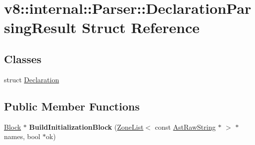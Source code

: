 \hypertarget{structv8_1_1internal_1_1_parser_1_1_declaration_parsing_result}{}\section{v8\+:\+:internal\+:\+:Parser\+:\+:Declaration\+Parsing\+Result Struct Reference}
\label{structv8_1_1internal_1_1_parser_1_1_declaration_parsing_result}
\subsection*{Classes}
\begin{DoxyCompactItemize}
\item 
struct \hyperlink{structv8_1_1internal_1_1_parser_1_1_declaration_parsing_result_1_1_declaration}{Declaration}
\end{DoxyCompactItemize}
\subsection*{Public Member Functions}
\begin{DoxyCompactItemize}
\item 
\hyperlink{classv8_1_1internal_1_1_block}{Block} $\ast$ {\bfseries Build\+Initialization\+Block} (\hyperlink{classv8_1_1internal_1_1_zone_list}{Zone\+List}$<$ const \hyperlink{classv8_1_1internal_1_1_ast_raw_string}{Ast\+Raw\+String} $\ast$ $>$ $\ast$names, bool $\ast$ok)\hypertarget{structv8_1_1internal_1_1_parser_1_1_declaration_parsing_result_a9042a8115d9b143ca256b043e28ee6b1}{}\label{structv8_1_1internal_1_1_parser_1_1_declaration_parsing_result_a9042a8115d9b143ca256b043e28ee6b1}

\end{DoxyCompactItemize}
